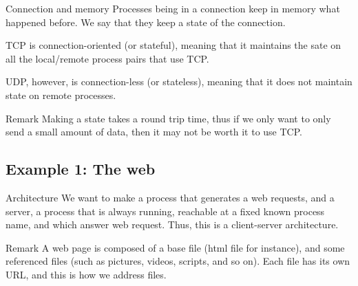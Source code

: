 \documentclass[a4paper]{article}
\begin{document}
\begin{parag}{Connection and memory}
    Processes being in a connection keep in memory what happened before. We say that they keep a state of the connection.

    TCP is connection-oriented (or stateful), meaning that it maintains the sate on all the local/remote process pairs that use TCP.

    UDP, however, is connection-less (or stateless), meaning that it does not maintain state on remote processes.

    \begin{subparag}{Remark}
        Making a state takes a round trip time, thus if we only want to only send a small amount of data, then it may not be worth it to use TCP. 
    \end{subparag}
    
\end{parag}

\subsection{Example 1: The web}
\begin{parag}{Architecture}
    We want to make a process that generates a web requests, and a server, a process that is always running, reachable at a fixed known process name, and which answer web request. Thus, this is a client-server architecture.

    \begin{subparag}{Remark}
        A web page is composed of a base file (html file for instance), and some referenced files (such as pictures, videos, scripts, and so on). Each file has its own URL, and this is how we address files.
    \end{subparag}
\end{parag}
\end{document}
